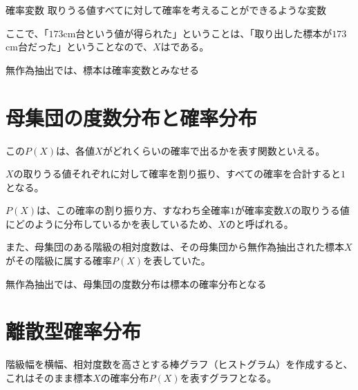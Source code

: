 \documentclass[../../../topic_statistics]{subfiles}
\begin{document}
\begin{definition}{確率変数}
  取りうる値すべてに対して確率を考えることができるような変数
\end{definition}

ここで、「$173$cm台という値が得られた」ということは、「取り出した標本が$173$cm台だった」ということなので、$X$はである。

\begin{emphabox}
  \begin{spacebox}
    \begin{center}
      無作為抽出では、標本は確率変数とみなせる
    \end{center}
  \end{spacebox}
\end{emphabox}

\sectionline
\section{母集団の度数分布と確率分布}

この$P(X)$は、各値$X$がどれくらいの確率で出るかを表す関数といえる。

\br

$X$の取りうる値それぞれに対して確率を割り振り、すべての確率を合計すると$1$となる。

$P(X)$は、この確率の割り振り方、すなわち全確率$1$が確率変数$X$の取りうる値にどのように分布しているかを表しているため、$X$のと呼ばれる。

\br

また、母集団のある階級の相対度数は、その母集団から無作為抽出された標本$X$がその階級に属する確率$P(X)$を表していた。

\begin{emphabox}
  \begin{spacebox}
    \begin{center}
      無作為抽出では、母集団の度数分布は標本の確率分布となる
    \end{center}
  \end{spacebox}
\end{emphabox}

\sectionline
\section{離散型確率分布}

階級幅を横幅、相対度数を高さとする棒グラフ（ヒストグラム）を作成すると、これはそのまま標本$X$の確率分布$P(X)$を表すグラフとなる。
\end{document}
